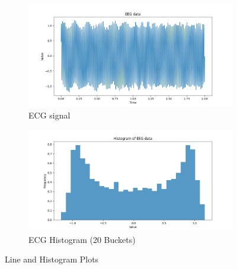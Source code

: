 \documentclass{article}
\begin{document}
 \begin{figure}[htbp]
  \centering
  \begin{subfigure}[b]{0.45\textwidth}
    \includegraphics[width=\textwidth]{img/ecg2/ECGlineplot.png}
    \caption{ECG signal}
    \label{fig:ecg_line}
  \end{subfigure}
  \hfill
  \begin{subfigure}[b]{0.45\textwidth}
    \includegraphics[width=\textwidth]{img/ecg2/ECGhistogram.png}
    \caption{ECG Histogram (20 Buckets)}
    \label{fig:ecghist}
  \end{subfigure}
  \caption{Line and Histogram Plots}
  \label{fig:ecg2_1}
\end{figure}
\end{document}
